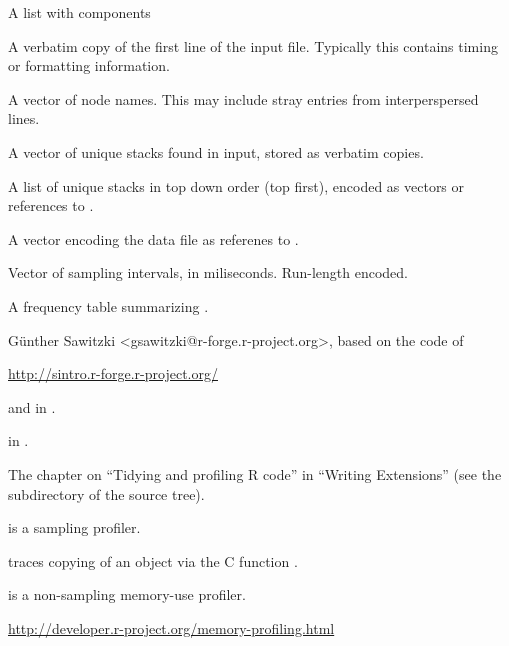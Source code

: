 \documentclass[a4paper]{book}
\begin{document}
\begin{Value}
A list with components
\begin{ldescription}
\item[\code{firstline}] A verbatim copy of the first line of the input file. 
Typically this contains timing or formatting information.
\item[\code{nodes}] A vector of node names. 
This may include stray entries from interperspersed lines.
\item[\code{stacks}] A vector of unique stacks found in input, stored as verbatim copies.
\item[\code{stacksrenc}] A list of unique stacks in top down order (top first), 
encoded as vectors or references to .
\item[\code{data}] A vector encoding the data file as referenes to  .
\item[\code{timesRLE}] Vector of sampling intervals, in miliseconds. Run-length encoded.
\item[\code{freq}] A frequency table summarizing .

\end{ldescription}
\end{Value}
%
\begin{Author}\relax
Günther Sawitzki <gsawitzki@r-forge.r-project.org>, based on the code of 
\end{Author}
%
\begin{References}\relax
  \url{http://sintro.r-forge.r-project.org/} 
\end{References}
%
\begin{SeeAlso}\relax
{}


 and   in .


 in .


The chapter on ``Tidying and profiling R code'' in
``Writing \R{} Extensions'' (see the  subdirectory
of the \R{} source tree).




 is a sampling profiler.

 traces copying of an object via the C function
.

 is a non-sampling memory-use profiler.

\url{http://developer.r-project.org/memory-profiling.html}
\end{SeeAlso}
\end{document}
